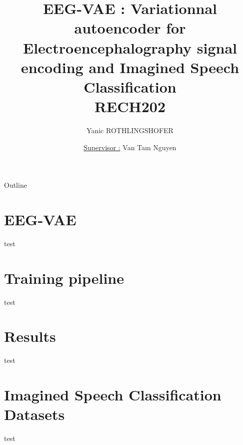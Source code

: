\documentclass[aspectratio=169]{beamer}
\title[State of the Art]{EEG-VAE : Variationnal autoencoder for Electroencephalography signal encoding and Imagined Speech Classification  \\ RECH202}
\author{Yanic ROTHLINGSHOFER\\[-0.3cm]}
\institute{\large \it Télécom Paris\\[-0.3cm]}
\date{\underline{Supervisor :} Van Tam Nguyen}
\begin{document}
\begin{frame}
  \titlepage
\end{frame}

\begin{frame}{Outline}
\tableofcontents
\end{frame}

\section{EEG-VAE}

\begin{frame}
test
\end{frame}

\section{Training pipeline}


\begin{frame}
test
\end{frame}



\section{Results}

\begin{frame}
test
\end{frame}


\section{Imagined Speech Classification Datasets}

\begin{frame}
test
\end{frame}
\end{document}

